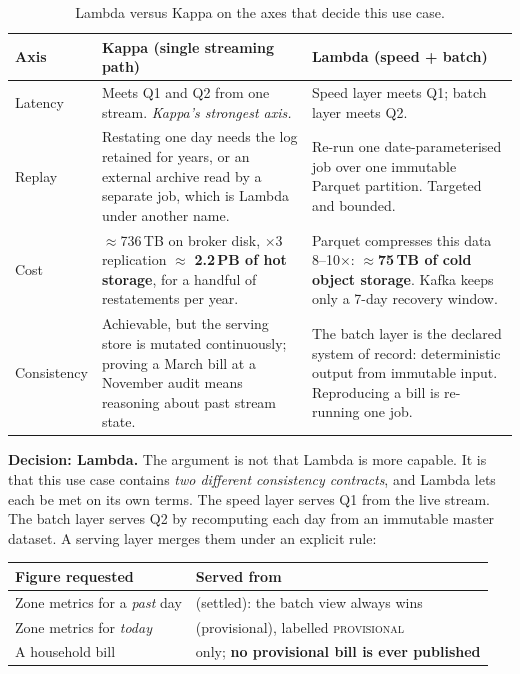 \documentclass[11pt,a4paper]{article}
\newcommand{\code}[1]{\texttt{\detokenize{#1}}}
\newcommand{\sq}{Q}
\begin{document}
\begin{table}[!htbp]
\centering\small
\caption{Lambda versus Kappa on the axes that decide this use case.}
\label{tab:axes}
\begin{tabularx}{\linewidth}{@{}l>{\raggedright\arraybackslash}X>{\raggedright\arraybackslash}X@{}}
\toprule
\textbf{Axis} & \textbf{Kappa (single streaming path)} & \textbf{Lambda (speed + batch)} \\
\midrule
Latency & Meets \sq1 and \sq2 from one stream. \emph{Kappa's strongest axis.} & Speed layer meets \sq1; batch layer meets \sq2. \\
Replay & Restating one day needs the log retained for years, or an external archive read by a separate job, which is Lambda under another name. & Re-run one date-parameterised job over one immutable Parquet partition. Targeted and bounded. \\
Cost & $\approx$736\,TB on broker disk, $\times$3 replication $\approx$ \textbf{2.2\,PB of hot storage}, for a handful of restatements per year. & Parquet compresses this data 8--10$\times$: $\approx$\textbf{75\,TB of cold object storage}. Kafka keeps only a 7-day recovery window. \\
Consistency & Achievable, but the serving store is mutated continuously; proving a March bill at a November audit means reasoning about past stream state. & The batch layer is the declared system of record: deterministic output from immutable input. Reproducing a bill is re-running one job. \\
\bottomrule
\end{tabularx}
\end{table}

\textbf{Decision: Lambda.} The argument is not that Lambda is more capable. It is
that this use case contains \emph{two different consistency contracts}, and Lambda
lets each be met on its own terms. The speed layer serves \sq1 from the live stream.
The batch layer serves \sq2 by recomputing each day from an immutable master dataset.
A serving layer merges them under an explicit rule:

\begin{center}\small
\begin{tabular}{@{}ll@{}}
\toprule
\textbf{Figure requested} & \textbf{Served from} \\
\midrule
Zone metrics for a \emph{past} day & \code{batch.*} (settled): the batch view always wins \\
Zone metrics for \emph{today} & \code{speed.*} (provisional), labelled \textsc{provisional} \\
A household bill & \code{batch.*} only; \textbf{no provisional bill is ever published} \\
\bottomrule
\end{tabular}
\end{center}
\end{document}
